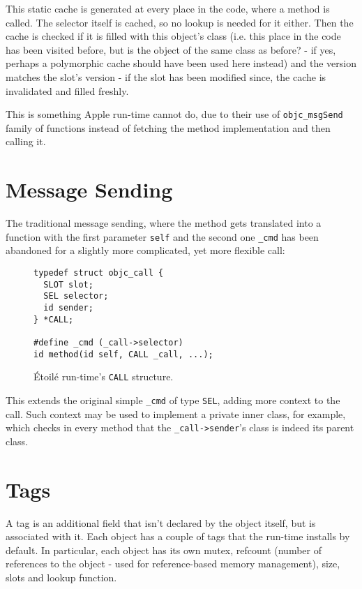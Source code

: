 This static cache is generated at every place in the code, where a method is called. The selector itself is cached, so no lookup is needed for it either. Then the cache is checked if it is filled with this object's class (i.e. this place in the code has been visited before, but is the object of the same class as before? - if yes, perhaps a polymorphic cache should have been used here instead) and the version matches the slot's version - if the slot has been modified since, the cache is invalidated and filled freshly.

This is something Apple run-time cannot do, due to their use of \verb=objc_msgSend= family of functions instead of fetching the method implementation and then calling it.

\section{Message Sending}

The traditional message sending, where the method gets translated into a function with the first parameter \verb=self= and the second one \verb=_cmd= has been abandoned for a slightly more complicated, yet more flexible call:

\begin{figure}[H]
\begin{verbatim}
typedef struct objc_call {
  SLOT slot;
  SEL selector;
  id sender;
} *CALL;

#define _cmd (_call->selector)
id method(id self, CALL _call, ...);
\end{verbatim}
  \centering{}
  \caption{\'Etoil\'e run-time's \texttt{CALL} structure.}
  \label{fig:etoile_CALL_struct}
\end{figure}

This extends the original simple \verb=_cmd= of type \verb=SEL=, adding more context to the call. Such context may be used to implement a private inner class, for example, which checks in every method that the \verb=_call->sender='s class is indeed its parent class.

\section{Tags}

A tag is an additional field that isn't declared by the object itself, but is associated with it. Each object has a couple of tags that the run-time installs by default. In particular, each object has its own mutex, refcount (number of references to the object - used for reference-based memory management), size, slots and lookup function.

